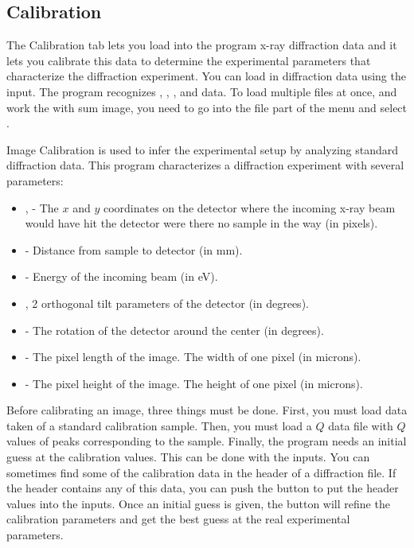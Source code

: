 \subsection{Calibration}

The Calibration tab lets you load into the program 
x-ray diffraction data and it lets you calibrate 
this data to determine the experimental parameters 
that characterize the diffraction experiment. You 
can load in diffraction data using the 
 input. The program 
recognizes , , 
, and  data. To load 
multiple files at once, and work the with sum image, 
you need to go into the file part of the menu and 
select .

Image Calibration is used to infer the experimental 
setup by analyzing standard diffraction data. This 
program characterizes a diffraction experiment 
with several parameters:
\begin{itemize}
    \item {},  - The $x$ 
and $y$ coordinates on the detector where the incoming 
x-ray beam would have hit the detector were there 
no sample in the way (in pixels).
    \item {} - Distance from sample to 
        detector (in mm).
    \item {} - Energy of the incoming beam (in eV).
    \item {},  2 orthogonal tilt 
        parameters of the detector (in degrees).
    \item {} - The rotation of the detector 
        around the center (in degrees).
    \item {} - The pixel length of the image. 
        The width of one pixel (in microns).
    \item {} - The pixel height of the image. 
        The height of one pixel (in microns).
\end{itemize}

Before calibrating an image, three things must be done. 
First, you must load data taken of a standard calibration 
sample. Then, you must load a $Q$ data file with $Q$ values 
of peaks corresponding to the sample. Finally, the program 
needs an initial guess at the calibration values. This can 
be done with the  inputs. You can sometimes 
find some of the calibration data in the header of a 
diffraction file. If the header contains any of this data, 
you can push the  button to put the 
header values into the inputs. Once an initial guess is 
given, the  button will refine the calibration 
parameters and get the best guess at the real experimental 
parameters.

